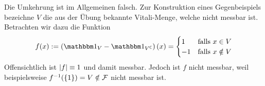 \begin{exercisePage}
    Die Umkehrung ist im Allgemeinen falsch. Zur Konstruktion eines Gegenbeispiels bezeichne $V$ die aus der Übung bekannte Vitali-Menge, welche nicht messbar ist. Betrachten wir dazu die Funktion
    \begin{equation*}
        f(x) \defeq \left( \one_V - \one_{V^\complement} \right) (x)       
        =   \begin{cases}
                1 &\text{falls } x \in V \\
                -1 &\text{falls } x \notin V
            \end{cases}
    \end{equation*}
    Offensichtlich ist $\left| f \right| \equiv 1$ und damit messbar. Jedoch ist $f$ nicht messbar, weil beispielsweise $f^{-1}(\left\{ 1 \right\}) = V \notin \mathcal{F}$ nicht messbar ist.
\end{exercisePage}